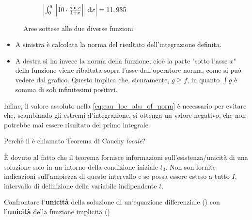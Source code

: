 \begin{exercise}
\begin{solution}
\begin{figure}[H]
\begin{subfigure}{.49\textwidth}
{
				}
				\caption{$\left|\int_0^6 \left\|10\cdot\frac{\sin{x}}{1+x}\right\| \,\mathrm{d}{x}\right| = 11,935$}
			\end{subfigure}
			\caption{Aree sottese alle due diverse funzioni}
		\end{figure}
		\begin{itemize}
			\item A sinistra è calcolata la norma del risultato dell'integrazione definita.
			\item A destra si ha invece la norma della funzione, cioè la parte "sotto l'asse $x$" della funzione viene ribaltata sopra l'asse dall'operatore norma, come si può vedere dal grafico. Questo implica che, sicuramente, $g \geq f$, in quanto $\int g$ è somma di soli infinitesimi positivi.
		\end{itemize}
		Infine, il valore assoluto nella \cref{eq:cau_loc_abs_of_norm} è necessario per evitare che, scambiando gli estremi d'integrazione, si ottenga un valore negativo, che non potrebbe mai essere risultato del primo integrale
	\end{solution}
\end{exercise}

\begin{exercise}
	Perchè il  è chiamato Teorema di Cauchy \textit{locale}?
	\begin{solution}
		È dovuto al fatto che il teorema fornisce informazioni sull'esistenza/unicità di una soluzione solo in un intorno della condizione iniziale $t_0$. Non son fornite indicazioni sull'ampiezza di questo intervallo e se possa essere esteso a tutto $I$, intervallo di definizione della variabile indipendente $t$.
	\end{solution}
\end{exercise}

\begin{exercise}
	Confrontare l'\textbf{unicità} della soluzione di un'equazione differenziale () con l'\textbf{unicità} della funzione implicita ()
\end{exercise}

